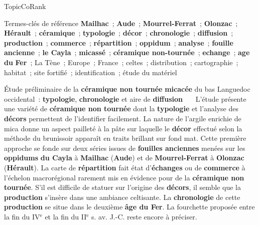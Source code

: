 \begin{frame}{TopicCoRank}
{\begin{exampleblock}
      \begin{exampleblock}{\small Termes-clés de référence}\justifying\small
        \textbf{Mailhac}~; \textbf{Aude}~; \textbf{Mourrel-Ferrat}~;
        \textbf{Olonzac}~; \textbf{Hérault}~; \textbf{céramique}~;
        \textbf{typologie}~; \textbf{décor}~; \textbf{chronologie}~;
        \textbf{diffusion}~; \textbf{production}~; \textbf{commerce}~;
        \textbf{répartition}~; \textbf{oppidum}~; \textbf{analyse}~;
        \textbf{fouille ancienne}~; \textbf{le Cayla}~;
        \textbf{micassé}~; \textbf{céramique non-tournée}~;
        \textbf{echange}~; \textbf{age du} \textbf{Fer}~; La Tène~;
        Europe~; France~; celtes~; distribution~; cartographie~; habitat~; site
        fortifié~; identification~; étude du matériel
      \end{exampleblock}
    \end{exampleblock}
  }{
    \begin{exampleblock}{\small
      Étude préliminaire de la \textbf{céramique non tournée}
      \textbf{micacée} du bas Languedoc occidental~: \textbf{typologie},
      \textbf{chronologie} et aire de \textbf{diffusion}
    }\justifying\small
      ~~~L'étude présente une variété de \textbf{céramique non tournée} dont la
      \textbf{typologie} et l'analyse des \textbf{décors} permettent de
      l'identifier facilement. La nature de l'argile enrichie de mica donne un
      aspect pailleté à la pâte sur laquelle le \textbf{décor} effectué selon
      la méthode du brunissoir apparaît en traits brillant sur fond mat. Cette
      première approche se fonde sur deux séries issues de \textbf{fouilles
      anciennes} menées sur les \textbf{oppidums} \textbf{du Cayla} à
      \textbf{Mailhac} (\textbf{Aude}) et de \textbf{Mourrel-Ferrat} à
      \textbf{Olonzac} (\textbf{Hérault}). La carte de
      \textbf{répartition} fait état d'\textbf{échanges} ou de
      \textbf{commerce} à l'échelon macrorégional rarement mis en évidence pour
      de la \textbf{céramique non tournée}. S'il est difficile de statuer sur
      l'origine des \textbf{décors}, il semble que la \textbf{production}
      s'insère dans une ambiance celtisante. La \textbf{chronologie} de cette
      \textbf{production} se situe dans le deuxième \textbf{âge du Fer}. La
      fourchette proposée entre la fin du IV$^\text{e}$ et la fin du II$^\text{e}$
      s. av. J.-C. reste encore à préciser.


\end{exampleblock}}
\end{frame}

